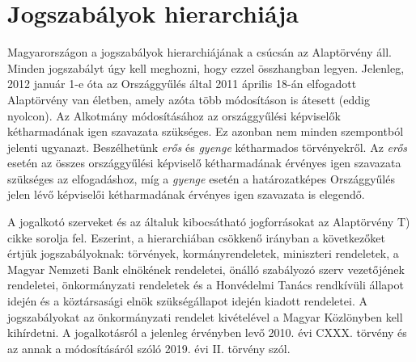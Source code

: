 \section{Jogszabályok hierarchiája}

Magyarországon a jogszabályok hierarchiájának a csúcsán az Alaptörvény áll. Minden jogszabályt úgy kell meghozni, hogy ezzel összhangban legyen. Jelenleg, 2012 január 1-e óta az Országgyűlés által 2011 április 18-án elfogadott Alaptörvény van életben, amely azóta több módosításon is átesett (eddig nyolcon). Az Alkotmány módosításához az országgyűlési képviselők kétharmadának igen szavazata szükséges. Ez azonban nem minden szempontból jelenti ugyanazt. Beszélhetünk \textit{erős} és \textit{gyenge} kétharmados törvényekről. Az \textit{erős} esetén az összes országgyűlési képviselő kétharmadának érvényes igen szavazata szükséges az elfogadáshoz, míg a \textit{gyenge} esetén a határozatképes Országgyűlés jelen lévő képviselői kétharmadának érvényes igen szavazata is elegendő.

A jogalkotó szerveket és az általuk kibocsátható jogforrásokat az Alaptörvény T) cikke sorolja fel. Eszerint, a hierarchiában csökkenő irányban a következőket értjük jogszabályoknak: törvények, kormányrendeletek, miniszteri rendeletek, a Magyar Nemzeti Bank elnökének rendeletei, önálló szabályozó szerv vezetőjének rendeletei, önkormányzati rendeletek és a Honvédelmi Tanács rendkívüli állapot idején és a köztársasági elnök szükségállapot idején kiadott rendeletei. A jogszabályokat az önkormányzati rendelet kivételével a Magyar Közlönyben kell kihírdetni. A jogalkotásról a jelenleg érvényben levő 2010. évi CXXX. törvény és az annak a módosításáról szóló 2019. évi II. törvény szól. \cite{jog-hierarchiaja, alaptorveny, 2010-CXXX, 2019-II}